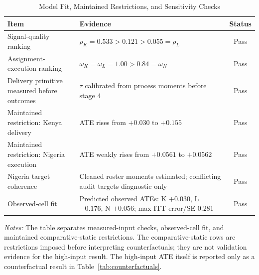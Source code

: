 \begin{table}[H]
\centering
\caption{Model Fit, Maintained Restrictions, and Sensitivity Checks}
\label{tab:struct_validation_checks}
\begin{threeparttable}
\footnotesize
\begin{tabular}[t]{>{\raggedright\arraybackslash}p{3.1cm}>{\raggedright\arraybackslash}p{8.0cm}c}
\toprule
Item & Evidence & Status \\
\midrule
Signal-quality ranking & $\rho_K=0.533>0.121>0.055=\rho_L$ & Pass \\
Assignment-execution ranking & $\omega_K=\omega_L=1.00>0.84=\omega_N$ & Pass \\
Delivery primitive measured before outcomes & $\tau$ calibrated from process moments before stage 4 & Pass \\
Maintained restriction: Kenya delivery & ATE rises from $+0.030$ to $+0.155$ & Pass \\
Maintained restriction: Nigeria execution & ATE weakly rises from $+0.0561$ to $+0.0562$ & Pass \\
Nigeria target coherence & Cleaned roster moments estimated; conflicting audit targets diagnostic only & Pass \\
Observed-cell fit & Predicted observed ATEs: K $+0.030$, L $-0.176$, N $+0.056$; max ITT error/SE 0.281 & Pass \\
\bottomrule
\end{tabular}
\begin{tablenotes}
\footnotesize
\item \textit{Notes:} The table separates measured-input checks, observed-cell fit, and maintained comparative-static restrictions. The comparative-static rows are restrictions imposed before interpreting counterfactuals; they are not validation evidence for the high-input result. The high-input ATE itself is reported only as a counterfactual result in Table~\ref{tab:counterfactuals}.
\end{tablenotes}
\end{threeparttable}
\end{table}
